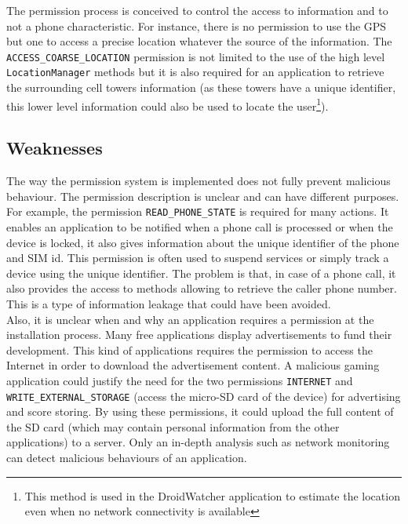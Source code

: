 The permission process is conceived to control the access to information and to not a phone characteristic.
For instance, there is no permission to use the GPS but one to access a precise location whatever the source of the information.
The \texttt{ACCESS\_COARSE\_LOCATION} permission is not limited to the use of the high level \texttt{LocationManager} methods but it is also required for an application to retrieve the surrounding cell towers information (as these towers have a unique identifier, this lower level information could also be used to locate the user\footnote{This method is used in the DroidWatcher application to estimate the location even when no network connectivity is available}).

\subsection{Weaknesses}

The way the permission system is implemented does not fully prevent malicious behaviour.
The permission description is unclear and can have different purposes.
For example, the permission \texttt{READ\_PHONE\_STATE} is required for many actions.
It enables an application to be notified when a phone call is processed or when the device is locked, it also gives information about the unique identifier of the phone and SIM id.
This permission is often used to suspend services or simply track a device using the unique identifier.
The problem is that, in case of a phone call, it also provides the access to methods allowing to retrieve the caller phone number.
This is a type of information leakage that could have been avoided.\\

Also, it is unclear when and why an application requires a permission at the installation process.
Many free applications display advertisements to fund their development.
This kind of applications requires the permission to access the Internet in order to download the advertisement content.
A malicious gaming application could justify the need for the two permissions \texttt{INTERNET} and \texttt{WRITE\_EXTERNAL\_STORAGE} (access the micro-SD card of the device) for advertising and score storing.
By using these permissions, it could upload the full content of the SD card (which may contain personal information from the other applications) to a server.
Only an in-depth analysis such as network monitoring can detect malicious behaviours of an application.\\

